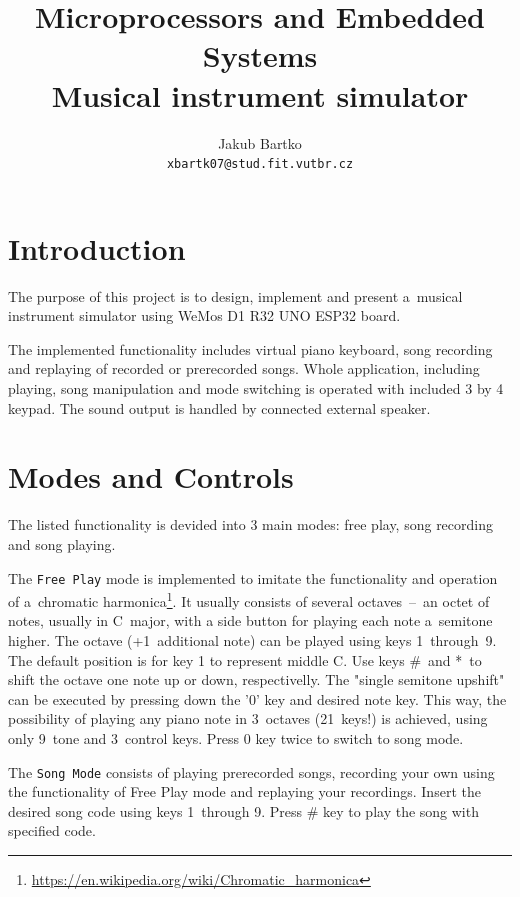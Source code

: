 \documentclass[a4paper, 11pt, twocolumn]{article}
\begin{document}
    \title{\LARGE{Microprocessors and Embedded Systems}\\\huge{Musical instrument simulator}}
        \author{Jakub Bartko \\ \texttt{xbartk07@stud.fit.vutbr.cz} \\ \the\year}
        \date{}
        \maketitle

\section{Introduction}
    The purpose of this project is to design, implement and present a~musical instrument simulator using WeMos D1 R32 UNO ESP32 board.
    
    The implemented functionality includes virtual piano keyboard, song recording and replaying of recorded or prerecorded songs. Whole application, including playing, song manipulation and mode switching is operated with included 3 by 4 keypad. The sound output is handled by connected external speaker.
    
\section{Modes and Controls}
    The listed functionality is devided into 3 main modes: free play, song recording and song playing.
    
    The \texttt{Free Play} mode is implemented to imitate the functionality and operation of a~chromatic harmonica\footnote{\url{https://en.wikipedia.org/wiki/Chromatic\_harmonica}}. It usually consists of several  octaves~--~an octet of notes, usually in C~major, with a side button for playing each note a~semitone higher. The octave (+1~additional note) can be played using keys 1~through~9. The default position is for key 1 to represent middle C. Use keys \#~and *~to shift the octave one note up or down, respectivelly. The "single semitone upshift" can be executed by pressing down the '0' key and desired note key. This way, the possibility of playing any piano note in 3~octaves (21~keys!) is achieved, using only 9~tone and 3~control keys. Press 0 key twice to switch to song mode.
    
    The \texttt{Song Mode} consists of playing prerecorded songs, recording your own using the functionality of Free Play mode and replaying your recordings.
    Insert the desired song code using keys 1~through 9. Press \# key to play the song with specified code.
    
\end{document}
